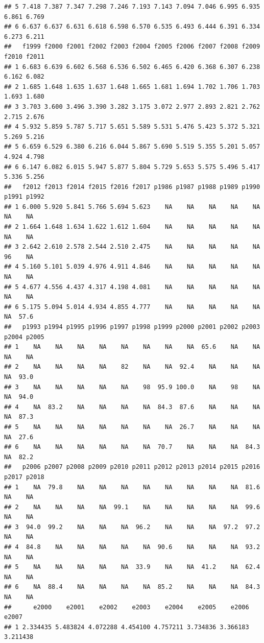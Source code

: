 \documentclass[
]{book}
\begin{document}
\begin{verbatim}
## 5 7.418 7.387 7.347 7.298 7.246 7.193 7.143 7.094 7.046 6.995 6.935 6.861 6.769
## 6 6.637 6.637 6.631 6.618 6.598 6.570 6.535 6.493 6.444 6.391 6.334 6.273 6.211
##   f1999 f2000 f2001 f2002 f2003 f2004 f2005 f2006 f2007 f2008 f2009 f2010 f2011
## 1 6.683 6.639 6.602 6.568 6.536 6.502 6.465 6.420 6.368 6.307 6.238 6.162 6.082
## 2 1.685 1.648 1.635 1.637 1.648 1.665 1.681 1.694 1.702 1.706 1.703 1.693 1.680
## 3 3.703 3.600 3.496 3.390 3.282 3.175 3.072 2.977 2.893 2.821 2.762 2.715 2.676
## 4 5.932 5.859 5.787 5.717 5.651 5.589 5.531 5.476 5.423 5.372 5.321 5.269 5.216
## 5 6.659 6.529 6.380 6.216 6.044 5.867 5.690 5.519 5.355 5.201 5.057 4.924 4.798
## 6 6.147 6.082 6.015 5.947 5.877 5.804 5.729 5.653 5.575 5.496 5.417 5.336 5.256
##   f2012 f2013 f2014 f2015 f2016 f2017 p1986 p1987 p1988 p1989 p1990 p1991 p1992
## 1 6.000 5.920 5.841 5.766 5.694 5.623    NA    NA    NA    NA    NA    NA    NA
## 2 1.664 1.648 1.634 1.622 1.612 1.604    NA    NA    NA    NA    NA    NA    NA
## 3 2.642 2.610 2.578 2.544 2.510 2.475    NA    NA    NA    NA    NA    96    NA
## 4 5.160 5.101 5.039 4.976 4.911 4.846    NA    NA    NA    NA    NA    NA    NA
## 5 4.677 4.556 4.437 4.317 4.198 4.081    NA    NA    NA    NA    NA    NA    NA
## 6 5.175 5.094 5.014 4.934 4.855 4.777    NA    NA    NA    NA    NA    NA  57.6
##   p1993 p1994 p1995 p1996 p1997 p1998 p1999 p2000 p2001 p2002 p2003 p2004 p2005
## 1    NA    NA    NA    NA    NA    NA    NA    NA  65.6    NA    NA    NA    NA
## 2    NA    NA    NA    NA    82    NA    NA  92.4    NA    NA    NA    NA  93.0
## 3    NA    NA    NA    NA    NA    98  95.9 100.0    NA    98    NA    NA  94.0
## 4    NA  83.2    NA    NA    NA    NA  84.3  87.6    NA    NA    NA    NA  87.3
## 5    NA    NA    NA    NA    NA    NA    NA  26.7    NA    NA    NA    NA  27.6
## 6    NA    NA    NA    NA    NA    NA  70.7    NA    NA    NA  84.3    NA  82.2
##   p2006 p2007 p2008 p2009 p2010 p2011 p2012 p2013 p2014 p2015 p2016 p2017 p2018
## 1    NA  79.8    NA    NA    NA    NA    NA    NA    NA    NA  81.6    NA    NA
## 2    NA    NA    NA    NA  99.1    NA    NA    NA    NA    NA  99.6    NA    NA
## 3  94.0  99.2    NA    NA    NA  96.2    NA    NA    NA  97.2  97.2    NA    NA
## 4  84.8    NA    NA    NA    NA    NA  90.6    NA    NA    NA  93.2    NA    NA
## 5    NA    NA    NA    NA    NA  33.9    NA    NA  41.2    NA  62.4    NA    NA
## 6    NA  88.4    NA    NA    NA    NA  85.2    NA    NA    NA  84.3    NA    NA
##      e2000    e2001    e2002    e2003    e2004    e2005    e2006    e2007
## 1 2.334435 5.483824 4.072288 4.454100 4.757211 3.734836 3.366183 3.211438

\end{verbatim}
\end{document}
